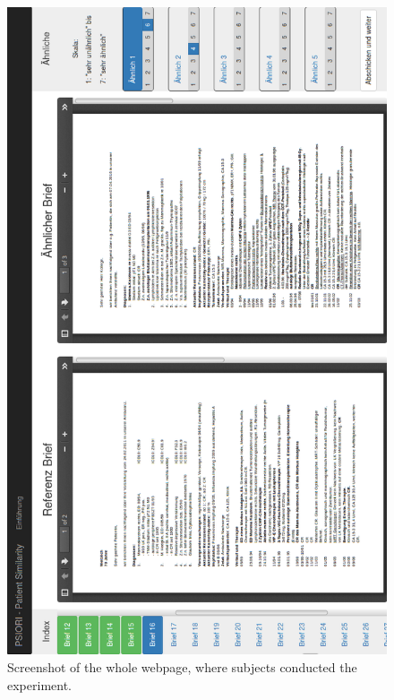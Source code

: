 \begin{figure}[h]
	\centering
	\includegraphics[width=0.85\linewidth]{figures/webexperiment_screenshot}
	\caption{Screenshot of the whole webpage, where subjects conducted the experiment.}
	\label{fig:whole_webexperiment}
\end{figure}


